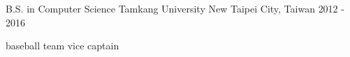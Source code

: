 

\begin{cventries}

  \cventry
    {B.S. in Computer Science} %
    {Tamkang University} %
    {New Taipei City, Taiwan} %
    {2012 - 2016} %
    {
      \begin{cvitems} %
        \item {baseball team vice captain}
      \end{cvitems}
    }

\end{cventries}
